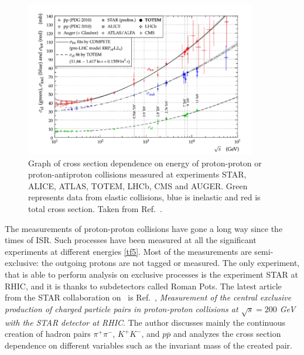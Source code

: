\FloatBarrier
\FloatBarrier
\begin{figure}[ht]
    \centering
    \includegraphics[width=0.9\textwidth]{figures/cspp.jpg}
    \caption[Cross section of pp and p$\overline{p}$ from different experiments]{Graph of cross section dependence on energy of proton-proton or proton-antiproton collisions measured at experiments STAR, ALICE, ATLAS, TOTEM, LHCb, CMS and AUGER. Green represents data from elastic collisions, blue is inelastic and red is total cross section. Taken from Ref.~\cite{zyla}.}
    \label{tf5}
\end{figure}
\FloatBarrier
The measurements of proton-proton collisions have gone a long way since the times of ISR. Such processes have been measured at all the significant experiments at different energies \autoref{tf5}. Most of the measurements are semi-exclusive: the outgoing protons are not tagged or measured. The only experiment, that is able to perform analysis on exclusive processes is the experiment STAR at RHIC, and it is thanks to subdetectors called Roman Pots. The latest article from the STAR collaboration on \DPE~is Ref.~\cite{Rafal20}, \textit{Measurement of the central exclusive production of charged particle pairs in proton-proton collisions at $\sqrt{s} = 200$ GeV with the STAR detector at RHIC}. The author discusses mainly the continuous creation of hadron pairs $\pi^+ \pi^-$, $K^+ K^-$, and $p\overline{p}$ and analyzes the cross section dependence on different variables such as the invariant mass of the created pair. 
\FloatBarrier
